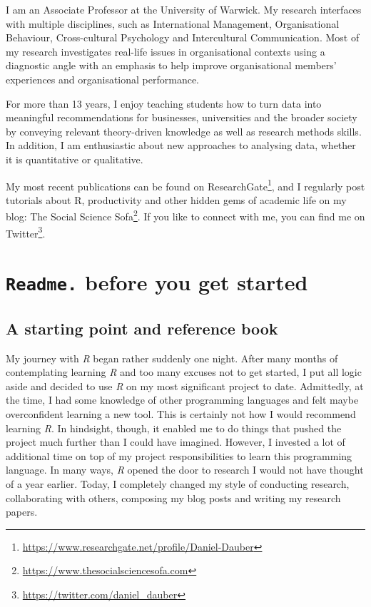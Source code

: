 \documentclass[
  letterpaper,
]{krantz}
\renewcommand{\href}[2]{#2\footnote{\url{#1}}}
\begin{document}

I am an Associate Professor at the University of Warwick. My research
interfaces with multiple disciplines, such as International Management,
Organisational Behaviour, Cross-cultural Psychology and Intercultural
Communication. Most of my research investigates real-life issues in
organisational contexts using a diagnostic angle with an emphasis to
help improve organisational members' experiences and organisational
performance.

For more than 13 years, I enjoy teaching students how to turn data into
meaningful recommendations for businesses, universities and the broader
society by conveying relevant theory-driven knowledge as well as
research methods skills. In addition, I am enthusiastic about new
approaches to analysing data, whether it is quantitative or qualitative.

My most recent publications can be found on
\href{https://www.researchgate.net/profile/Daniel-Dauber}{ResearchGate},
and I regularly post tutorials about R, productivity and other hidden
gems of academic life on my blog:
\href{https://www.thesocialsciencesofa.com}{The Social Science Sofa}. If
you like to connect with me, you can find me on
\href{https://twitter.com/daniel_dauber}{Twitter}.


\chapter{\texorpdfstring{\texttt{Readme.} before you get
started}{Readme. before you get started}}\label{sec-readme-before-you-get-started}

\section{A starting point and reference
book}\label{sec-a-starting-point-and-reference-book}

My journey with \emph{R} began rather suddenly one night. After many
months of contemplating learning \emph{R} and too many excuses not to
get started, I put all logic aside and decided to use \emph{R} on my
most significant project to date. Admittedly, at the time, I had some
knowledge of other programming languages and felt maybe overconfident
learning a new tool. This is certainly not how I would recommend
learning \emph{R}. In hindsight, though, it enabled me to do things that
pushed the project much further than I could have imagined. However, I
invested a lot of additional time on top of my project responsibilities
to learn this programming language. In many ways, \emph{R} opened the
door to research I would not have thought of a year earlier. Today, I
completely changed my style of conducting research, collaborating with
others, composing my blog posts and writing my research papers.
\end{document}
